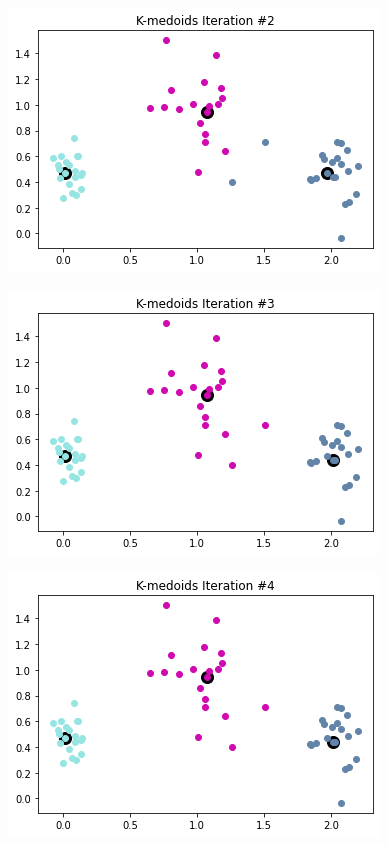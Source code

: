 \documentclass[11pt]{article}
\begin{document}
\begin{center}
    \includegraphics[scale=0.6]{2e-2.png}
\end{center}

\begin{center}
    \includegraphics[scale=0.6]{2e-3.png}
\end{center}

\begin{center}
    \includegraphics[scale=0.6]{2e-4.png}
\end{center}
\end{document}
